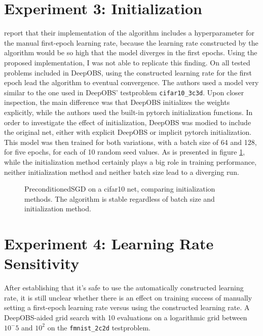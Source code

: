 \documentclass[twoside,12pt,a4paper]{report}
\begin{document}
\section{Experiment 3: Initialization}
\cite{roos2019active} report that their implementation of the algorithm includes a hyperparameter for the manual first-epoch learning rate, because the learning rate constructed by the algorithm would be so high that the model diverges in the first epochs. Using the proposed implementation, I was not able to replicate this finding. On all tested problems included in DeepOBS, using the constructed learning rate for the first epoch lead the algorithm to eventual convergence. The authors used a model very similar to the one used in DeepOBS' testproblem \verb|cifar10_3c3d|. Upon closer inspection, the main difference was that DeepOBS initializes the weights explicitly, while the authors used the built-in pytorch initialization functions.
In order to investigate the effect of initialization, DeepOBS was modied to include the original net, either with explicit DeepOBS or implicit pytorch initialization. This model was then trained for both variations, with a batch size of 64 and 128, for five epochs, for each of 10 random seed values.
As is presented in figure \ref{fig:exp_init}, while the initialization method certainly plays a big role in training performance, neither initialization method and neither batch size lead to a diverging run.
\begin{figure}
	\centering \hspace{-1,5cm}
	
	\caption{PreconditionedSGD on a cifar10 net, comparing initialization methods. The algorithm is stable regardless of batch size and initialization method.}
	\label{fig:exp_init}
	
\end{figure}


\section{Experiment 4: Learning Rate Sensitivity}

After establishing that it's safe to use the automatically constructed learning rate, it is still unclear whether there is an effect on training success of manually setting a first-epoch learning rate versus using the constructed learning rate.
A DeepOBS-aided grid search with 10 evaluations on a logarithmic grid between $10^-5$ and $10^2$ on the \verb|fmnist_2c2d| testproblem.
\end{document}

